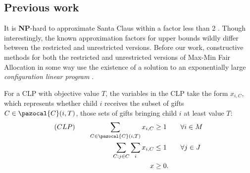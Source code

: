 \subsection{Previous work}


It is \textbf{NP}-hard to approximate Santa Claus within 
a factor less than 2 \cite{BezakovaD05}. 
Though interestingly, the known approximation factors for upper bounds wildly differ between the 
restricted and unrestricted versions. 
Before our work, constructive methods for both the restricted and unrestricted versions of 
Max-Min Fair Allocation in some way use the existence of a solution to an exponentially large
\textit{configuration linear program}  \cite{SantaClaus-BansalSviridenko-STOC2006, AlgoForSantaClaus-AnnamalaiKalaitzisSvenssonSODA15, AS10, MaxMinFairAllocation-ChakrabartyChuzhoyKhannaFOCS09, ChengM18}.
 
For a CLP with objective value $T$, 
the variables in the CLP take the form $x_{i,C}$, 
which represents whether child $i$ receives the subset of gifts $C \in  \pazocal{C}(i,T)$, 
those sets of gifts bringing child $i$ at least value $T$:
\begin{align*}(CLP) \qquad
\sum_{C \in \pazocal{C}(i,T)} x_{i,C} &\geq 1  \qquad \forall i \in M \\
\sum_{C: j \in C} \sum_{i} x_{i,C} &\leq 1 \qquad \forall j \in J \\ 
x &\geq 0.
\end{align*}


